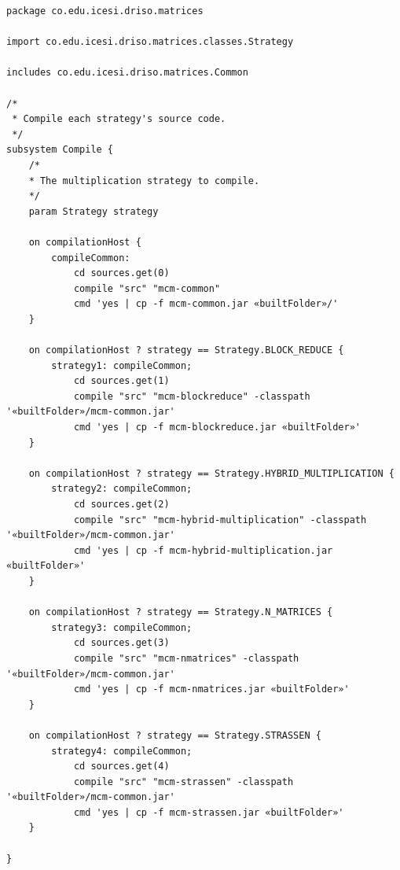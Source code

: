 \documentclass{article}
\begin{document}
\begin{lstlisting}[style=amelia,caption=Subsystem for compiling the source code]
package co.edu.icesi.driso.matrices

import co.edu.icesi.driso.matrices.classes.Strategy

includes co.edu.icesi.driso.matrices.Common

/*
 * Compile each strategy's source code.
 */
subsystem Compile {
    /*
    * The multiplication strategy to compile.
    */
	param Strategy strategy

	on compilationHost {	 
		compileCommon:
			cd sources.get(0)
			compile "src" "mcm-common"
			cmd 'yes | cp -f mcm-common.jar «builtFolder»/'
	}

	on compilationHost ? strategy == Strategy.BLOCK_REDUCE {
		strategy1: compileCommon;
			cd sources.get(1)
			compile "src" "mcm-blockreduce" -classpath '«builtFolder»/mcm-common.jar'
			cmd 'yes | cp -f mcm-blockreduce.jar «builtFolder»'
	}

	on compilationHost ? strategy == Strategy.HYBRID_MULTIPLICATION {
		strategy2: compileCommon;
			cd sources.get(2)
			compile "src" "mcm-hybrid-multiplication" -classpath '«builtFolder»/mcm-common.jar'
			cmd 'yes | cp -f mcm-hybrid-multiplication.jar «builtFolder»'
	}

	on compilationHost ? strategy == Strategy.N_MATRICES {
		strategy3: compileCommon;
			cd sources.get(3)
			compile "src" "mcm-nmatrices" -classpath '«builtFolder»/mcm-common.jar'
			cmd 'yes | cp -f mcm-nmatrices.jar «builtFolder»'
	}

	on compilationHost ? strategy == Strategy.STRASSEN {
		strategy4: compileCommon;
			cd sources.get(4)
			compile "src" "mcm-strassen" -classpath '«builtFolder»/mcm-common.jar'
			cmd 'yes | cp -f mcm-strassen.jar «builtFolder»'
	}

}

\end{lstlisting}
\end{document}
